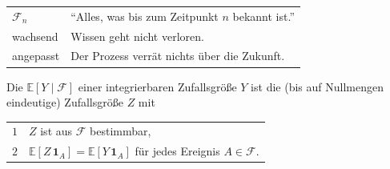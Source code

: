 \begin{merksatz}
\begin{center}
{\small
\renewcommand{\arraystretch}{1.52}
\begin{tabular}{@{}P{2.4cm}P{6.2cm}@{}}
\toprule
$\mathcal F_n$ & \enquote{Alles, was bis zum Zeitpunkt $n$ bekannt ist.}\\
wachsend & Wissen geht nicht verloren.\\
angepasst & Der Prozess verrät nichts über die Zukunft.\\
\bottomrule
\end{tabular}}
\end{center}

\begin{center}
\begin{minipage}{0.88\textwidth}
\end{minipage}
\end{center}
\end{merksatz}

\begin{definition}
Die  $\mathbb{E}[Y \mid \mathcal F]$ einer integrierbaren Zufallsgröße $Y$ ist die (bis auf Nullmengen eindeutige) Zufallsgröße $Z$ mit
\begin{center}
{\small
\renewcommand{\arraystretch}{1.5}
\begin{tabular}{@{}P{1.0cm}P{7.4cm}@{}}
\toprule
$1$ & $Z$ ist aus $\mathcal F$ bestimmbar,\\
$2$ & $\mathbb{E}[Z\,\mathbf 1_A] = \mathbb{E}[Y\,\mathbf 1_A]$ für jedes Ereignis $A \in \mathcal F$.\\
\bottomrule
\end{tabular}}
\end{center}
\end{definition}

